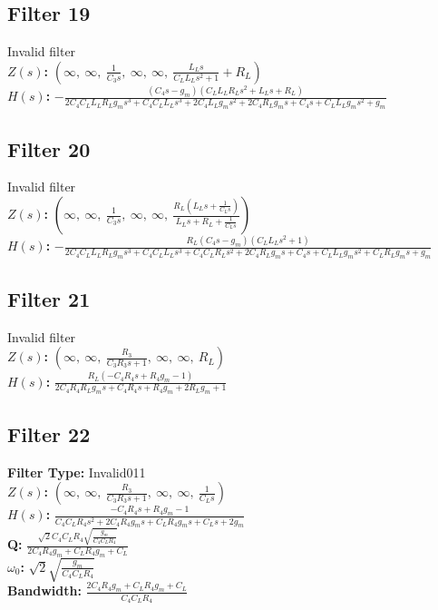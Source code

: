 \documentclass{article}
\begin{document}
\subsection*{Filter 19}
Invalid filter \\ 
\textbf{$Z(s)$:} $\left( \infty, \  \infty, \  \frac{1}{C_{3} s}, \  \infty, \  \infty, \  \frac{L_{L} s}{C_{L} L_{L} s^{2} + 1} + R_{L}\right)$ \\ 
\textbf{$H(s)$:} $- \frac{\left(C_{4} s - g_{m}\right) \left(C_{L} L_{L} R_{L} s^{2} + L_{L} s + R_{L}\right)}{2 C_{4} C_{L} L_{L} R_{L} g_{m} s^{3} + C_{4} C_{L} L_{L} s^{3} + 2 C_{4} L_{L} g_{m} s^{2} + 2 C_{4} R_{L} g_{m} s + C_{4} s + C_{L} L_{L} g_{m} s^{2} + g_{m}}$ \\ 
\subsection*{Filter 20}
Invalid filter \\ 
\textbf{$Z(s)$:} $\left( \infty, \  \infty, \  \frac{1}{C_{3} s}, \  \infty, \  \infty, \  \frac{R_{L} \left(L_{L} s + \frac{1}{C_{L} s}\right)}{L_{L} s + R_{L} + \frac{1}{C_{L} s}}\right)$ \\ 
\textbf{$H(s)$:} $- \frac{R_{L} \left(C_{4} s - g_{m}\right) \left(C_{L} L_{L} s^{2} + 1\right)}{2 C_{4} C_{L} L_{L} R_{L} g_{m} s^{3} + C_{4} C_{L} L_{L} s^{3} + C_{4} C_{L} R_{L} s^{2} + 2 C_{4} R_{L} g_{m} s + C_{4} s + C_{L} L_{L} g_{m} s^{2} + C_{L} R_{L} g_{m} s + g_{m}}$ \\ 
\subsection*{Filter 21}
Invalid filter \\ 
\textbf{$Z(s)$:} $\left( \infty, \  \infty, \  \frac{R_{3}}{C_{3} R_{3} s + 1}, \  \infty, \  \infty, \  R_{L}\right)$ \\ 
\textbf{$H(s)$:} $\frac{R_{L} \left(- C_{4} R_{4} s + R_{4} g_{m} - 1\right)}{2 C_{4} R_{4} R_{L} g_{m} s + C_{4} R_{4} s + R_{4} g_{m} + 2 R_{L} g_{m} + 1}$ \\ 
\subsection*{Filter 22}
\textbf{Filter Type:} Invalid011 \\ 
\textbf{$Z(s)$:} $\left( \infty, \  \infty, \  \frac{R_{3}}{C_{3} R_{3} s + 1}, \  \infty, \  \infty, \  \frac{1}{C_{L} s}\right)$ \\ 
\textbf{$H(s)$:} $\frac{- C_{4} R_{4} s + R_{4} g_{m} - 1}{C_{4} C_{L} R_{4} s^{2} + 2 C_{4} R_{4} g_{m} s + C_{L} R_{4} g_{m} s + C_{L} s + 2 g_{m}}$ \\ 
\textbf{Q:} $\frac{\sqrt{2} C_{4} C_{L} R_{4} \sqrt{\frac{g_{m}}{C_{4} C_{L} R_{4}}}}{2 C_{4} R_{4} g_{m} + C_{L} R_{4} g_{m} + C_{L}}$ \\ 
\textbf{$\omega_0$:} $\sqrt{2} \sqrt{\frac{g_{m}}{C_{4} C_{L} R_{4}}}$ \\ 
\textbf{Bandwidth:} $\frac{2 C_{4} R_{4} g_{m} + C_{L} R_{4} g_{m} + C_{L}}{C_{4} C_{L} R_{4}}$ \\ 
\end{document}
